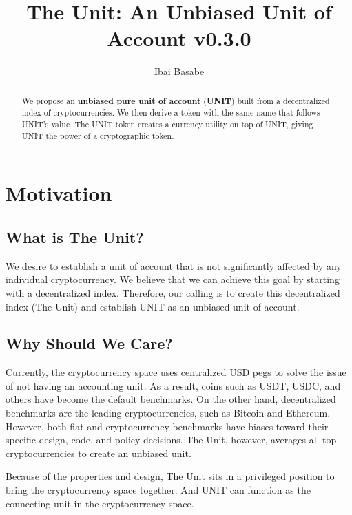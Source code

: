 \documentclass[12pt]{article}
\title{The Unit: An Unbiased Unit of Account v0.3.0}
\author{Ibai Basabe}
\begin{document}
\pagecolor{yellow!15!}

\date{}

\maketitle


\begin{abstract}
We propose an {\bf unbiased pure unit of account} ({\bf UNIT}) built from a decentralized index of cryptocurrencies. We then derive a token with the same name that follows UNIT's value. The UNIT token creates a currency utility on top of UNIT, giving UNIT the power of a cryptographic token.
\end{abstract}


\tableofcontents
\newpage

\section{Motivation}

\subsection{What is The Unit?}

We desire to establish a unit of account that is not significantly affected by any individual cryptocurrency. We believe that we can achieve this goal by starting with a decentralized index. Therefore, our calling is to create this decentralized index (The Unit) and establish UNIT as an unbiased unit of account.

\subsection{Why Should We Care?}

Currently, the cryptocurrency space uses centralized USD pegs to solve the issue of not having an accounting unit. As a result, coins such as USDT, USDC, and others have become the default benchmarks. On the other hand, decentralized benchmarks are the leading cryptocurrencies, such as Bitcoin and Ethereum. However, both fiat and cryptocurrency benchmarks have biases toward their specific design, code, and policy decisions. The Unit, however, averages all top cryptocurrencies to create an unbiased unit.

Because of the properties and design, The Unit sits in a privileged position to bring the cryptocurrency space together. And UNIT can function as the connecting unit in the cryptocurrency space.
\end{document}
